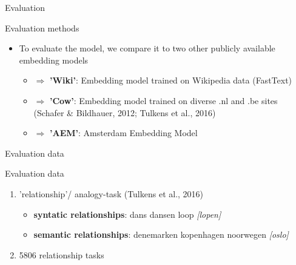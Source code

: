 \documentclass[compress]{beamer}
\begin{document}
\begin{frame}{Evaluation}
	\begin{block}{Evaluation methods}
		\begin{itemize}
			\item To evaluate the model, we compare it to two other publicly available embedding models
			\begin{itemize}
				\item $\Rightarrow$ \textbf {'Wiki'}: Embedding model trained on Wikipedia data (FastText)
				\item $\Rightarrow$ \textbf{'Cow'}: Embedding model trained on diverse .nl and .be sites (Schafer \& Bildhauer, 2012; Tulkens et al., 2016)
				\item $\Rightarrow$ \textbf{'AEM'}: Amsterdam Embedding Model
			\end{itemize}
		\end{itemize}
	\end{block}
\end{frame}


\begin{frame}{Evaluation data}
	\begin{block}{Evaluation data}
		\begin{enumerate}
			\item 'relationship'/ analogy-task (Tulkens et al., 2016)
			\begin{itemize}
				\item \textbf{syntatic relationships}: dans dansen loop \textit{[lopen]}
				\item \textbf{semantic relationships}: denemarken kopenhagen noorwegen \textit{[oslo]}
			\end{itemize}
			\item 5806 relationship tasks
		\end{enumerate}
	\end{block}
\end{frame}

\end{document}
